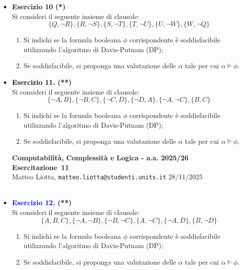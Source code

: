 \documentclass[a4paper,10pt]{article}
\makeatletter
\newcommand{\EsercitazioneNum}{11}
\newcommand{\Data}{28/11/2025}
\newcommand{\DocType}{Esercitazione} %
\newcommand{\FullTitle}{\DocType\ \EsercitazioneNum}
\newcommand{\Header}{
\noindent
  \small \textbf{Computabilità, Complessità e Logica - a.a. 2025/26} \hfill \textbf{\FullTitle} \\[0.2cm]
  \scriptsize Matteo Liotta, \texttt{matteo.liotta@studenti.units.it} \hfill \Data \\[0.2cm]
  \noindent\makebox[\linewidth]{\rule{\linewidth}{0.4pt}} \\[0.3cm]}
\newcommand{\NewPageHeader}{
  \vfill
  \noindent\makebox[\linewidth]{\rule{\linewidth}{0.4pt}}
  \newpage
  {\Header}
}
\makeatother
\begin{document}
{\begin{itemize}[label=, leftmargin=0pt]
    $$\phi:=(\ \lnot(X_1\lor X_2)\ \lor \ (X_3 \lor X_4)\  )\ \land\ X_5$$
    
    Si scriva $\phi$ in forma congiuntiva di clausole CNF.\\[0.2cm]

    \textbf{\underline{Algoritmi di Soddisfacibilità: \textit{Davis-Putnam} (DP)}}
    
    \item \textbf{Esercizio 10 (*)}\\ 	
    Si consideri il seguente insieme di clausole:
    $$\{Q,\lnot R\}, \{R,\lnot S\},\{S,\lnot T\},\{T,\lnot U\},\{U,\lnot W\},\{W,\lnot Q\}$$
    
    \begin{enumerate}
        \item Si indichi se la formula booleana $\phi$ corrispondente è soddisfacibile utilizzando l'algoritmo di Davis-Putnam (DP);
        \item Se soddisfacibile, si proponga una valutazione delle  $\alpha$ tale per cui $\alpha\models\phi$.
    \end{enumerate}

    \item \textbf{\textcolor{black}{Esercizio 11.} (**)}\\ 	
    Si consideri il seguente insieme di clausole:
    $$\{\lnot A,B\}, \{\lnot B,C\}, \{\lnot C,D\},\{\lnot D,A\},\{\lnot A, \lnot C\},\{B, C\}$$
    \begin{enumerate}
        \item Si indichi se la formula booleana $\phi$ corrispondente è soddisfacibile utilizzando l'algoritmo di Davis-Putnam (DP);
        \item Se soddisfacibile, si proponga una valutazione delle  $\alpha$ tale per cui $\alpha\models\phi$.\\[0.2cm]
    \end{enumerate}

    \NewPageHeader
    
    \item \textbf{\textcolor{blue}{Esercizio 12.} (**)}\\ 	
    Si consideri il seguente insieme di clausole:
    $$\{A, B, C\}, \{\lnot A, \lnot B\}, \{\lnot B, \lnot C\}, \{A, \lnot C\}, \{\lnot A, D\}, \{B, \lnot D\}$$
    \begin{enumerate}
        \item Si indichi se la formula booleana $\phi$ corrispondente è soddisfacibile utilizzando l'algoritmo di Davis-Putnam (DP);
        \item Se soddisfacibile, si proponga una valutazione delle  $\alpha$ tale per cui $\alpha\models\phi$.\\[0.2cm]
    \end{enumerate}


\end{itemize}}
\end{document}
